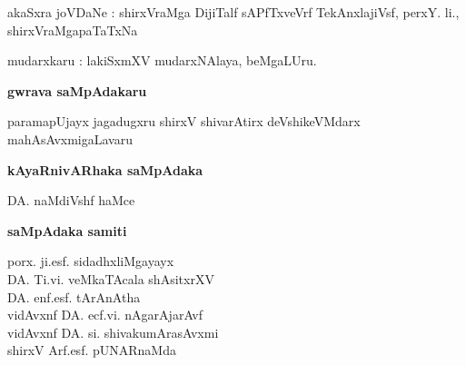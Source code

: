 \bigskip

\noindent
akaSxra joVDaNe : shirxVraMga DijiTalf sAPfTxveVrf TekAnxlajiVsf, perxY. li., shirxVraMgapaTaTxNa

\medskip

\noindent
mudarxkaru : lakiSxmXV mudarxNAlaya, beMgaLUru.

\newpage

\thispagestyle{empty}

\phantom{a}

\vfill

\begin{center}


{\Large\bf gwrava saMpAdakaru}\\

\medskip

{\large paramapUjayx jagadugxru shirxV shivarAtirx deVshikeVMdarx mahAsAvxmigaLavaru}

\vskip 1cm

{\Large\bf kAyaRnivARhaka saMpAdaka}

\medskip

{\fontsize{14pt}{16pt}\selectfont
DA. naMdiVshf haMce}\relax

\vskip 1cm


{\Large\bf saMpAdaka samiti}

\bigskip
\medskip

{\fontsize{14pt}{16pt}\selectfont
porx. ji.esf. sidadhxliMgayayx\\[8pt]
DA. Ti.vi. veMkaTAcala shAsitxrXV\\[8pt]
DA. enf.esf. tArAnAtha\\[8pt]
vidAvxnf DA. ecf.vi. nAgarAjarAvf\\[8pt]
vidAvxnf DA. si. shivakumArasAvxmi\\[8pt]
shirxV Arf.esf. pUNARnaMda\\[15pt]
}\relax
\end{center}

\vfill

\phantom{a}







